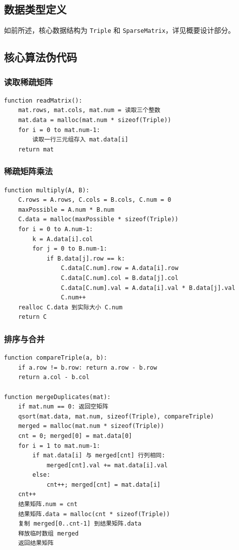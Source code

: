 \documentclass[UTF8]{ctexart}
\begin{document}
\subsection{数据类型定义}
如前所述，核心数据结构为 \texttt{Triple} 和 \texttt{SparseMatrix}，详见概要设计部分。

\subsection{核心算法伪代码}

\subsubsection{读取稀疏矩阵}
\begin{lstlisting}
function readMatrix():
    mat.rows, mat.cols, mat.num = 读取三个整数
    mat.data = malloc(mat.num * sizeof(Triple))
    for i = 0 to mat.num-1:
        读取一行三元组存入 mat.data[i]
    return mat
\end{lstlisting}

\subsubsection{稀疏矩阵乘法}
\begin{lstlisting}
function multiply(A, B):
    C.rows = A.rows, C.cols = B.cols, C.num = 0
    maxPossible = A.num * B.num
    C.data = malloc(maxPossible * sizeof(Triple))
    for i = 0 to A.num-1:
        k = A.data[i].col
        for j = 0 to B.num-1:
            if B.data[j].row == k:
                C.data[C.num].row = A.data[i].row
                C.data[C.num].col = B.data[j].col
                C.data[C.num].val = A.data[i].val * B.data[j].val
                C.num++
    realloc C.data 到实际大小 C.num
    return C
\end{lstlisting}

\subsubsection{排序与合并}
\begin{lstlisting}
function compareTriple(a, b):
    if a.row != b.row: return a.row - b.row
    return a.col - b.col

function mergeDuplicates(mat):
    if mat.num == 0: 返回空矩阵
    qsort(mat.data, mat.num, sizeof(Triple), compareTriple)
    merged = malloc(mat.num * sizeof(Triple))
    cnt = 0; merged[0] = mat.data[0]
    for i = 1 to mat.num-1:
        if mat.data[i] 与 merged[cnt] 行列相同:
            merged[cnt].val += mat.data[i].val
        else:
            cnt++; merged[cnt] = mat.data[i]
    cnt++
    结果矩阵.num = cnt
    结果矩阵.data = malloc(cnt * sizeof(Triple))
    复制 merged[0..cnt-1] 到结果矩阵.data
    释放临时数组 merged
    返回结果矩阵
\end{lstlisting}
\end{document}
